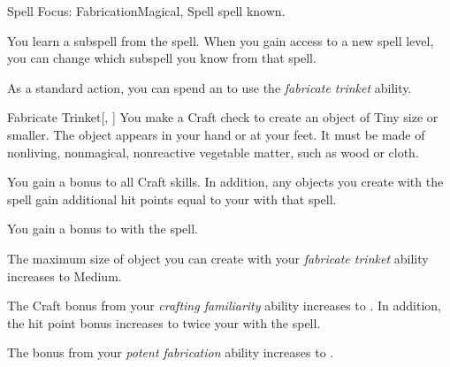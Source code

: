     \begin{feat}{Spell Focus: Fabrication}{Magical, Spell}
        \featpre {} spell known.

         You learn a subspell from the  spell.
        When you gain access to a new spell level, you can change which subspell you know from that spell.

         As a standard action, you can spend an  to use the \textit{fabricate trinket} ability.
        \begin{ability}{Fabricate Trinket}[, ]
            You make a Craft check to create an object of Tiny size or smaller.
            The object appears in your hand or at your feet.
            It must be made of nonliving, nonmagical, nonreactive vegetable matter, such as wood or cloth.
        \end{ability}

         You gain a  bonus to all Craft skills.
        In addition, any objects you create with the  spell gain additional hit points equal to your  with that spell.

         You gain a  bonus to  with the  spell.

         The maximum size of object you can create with your \textit{fabricate trinket} ability increases to Medium.

         The Craft bonus from your \textit{crafting familiarity} ability increases to .
        In addition, the hit point bonus increases to twice your  with the  spell.

         The bonus from your \textit{potent fabrication} ability increases to .
    \end{feat}

